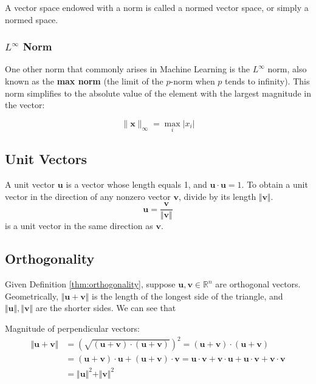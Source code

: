 \documentclass{article}
\begin{document}
\noindent A vector space endowed with a norm is called a normed vector
space, or simply a normed space.


\subsubsection{$L^\infty$ Norm}
\noindent One other norm that commonly arises in Machine Learning is the $L^{\infty}$ norm, also known as the \textbf{max norm} (the limit of the $p$-norm when $p$ tends to infinity). This norm simplifies to the absolute value of the element with the largest magnitude in the vector:

\begin{equation*}
    \lVert \bm{x} \rVert_\infty = \max_i \lvert x_i \rvert 
\end{equation*}

\subsection{Unit Vectors}
\begin{definition}
    A unit vector $\bm{u}$ is a vector whose length equals 1, and $\bm{u} \cdot \bm{u} = 1$. To obtain a unit vector in the direction of any nonzero vector $\bm{v}$, divide by its length $\Vert \bm{v} \Vert$.
    \begin{equation*}
        \bm{u} = \frac{\bm{v}}{\Vert \bm{v} \Vert}
    \end{equation*} is a unit vector in the same direction as $\bm{v}$.
\end{definition}

\subsection{Orthogonality}\label{sec:orthogonality}
Given Definition \ref{thm:orthogonality}, suppose $\bm{u}, \bm{v} \in \mathbb{R}^n$ are orthogonal vectors. Geometrically, $\Vert \bm{u} + \bm{v} \Vert$ is the length of the longest side of the triangle, and $\Vert \bm{u} \Vert, \Vert \bm{v} \Vert$ are the shorter sides. We can see that 

\begin{theorem}\label{thm:triangleperp}
    Magnitude of perpendicular vectors:
    \begin{align*}
        \Vert \bm{u} + \bm{v} \Vert &= \left(\sqrt{(\bm{u} + \bm{v}) \cdot (\bm{u} + \bm{v})} \right)^{2} = (\bm{u} + \bm{v}) \cdot (\bm{u} + \bm{v}) \\ 
        &= (\bm{u} + \bm{v}) \cdot \bm{u} + (\bm{u} + \bm{v}) \cdot \bm{v} = \bm{u} \cdot \bm{v} + \bm{v} \cdot \bm{u} + \bm{u} \cdot \bm{v} + \bm{v} \cdot \bm{v} \\ 
        &= \Vert \bm{u} \Vert ^{2} + \Vert \bm{v} \Vert ^{2}
    \end{align*}
\end{theorem}
\end{document}
